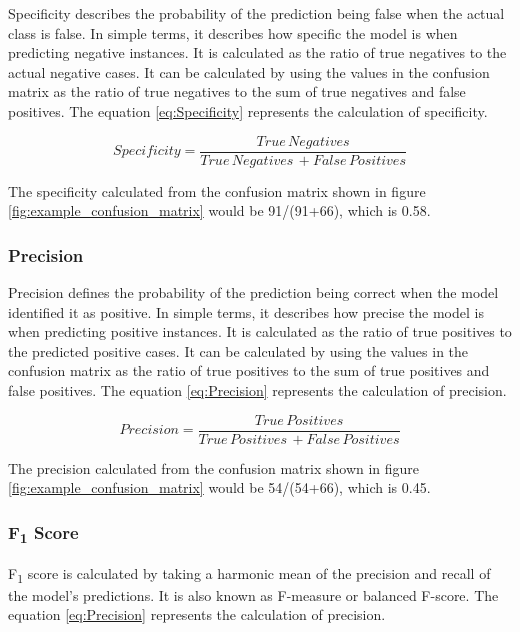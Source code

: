 \documentclass[11pt,openright]{report}
\begin{document}
Specificity describes the probability of the prediction being false when the actual class is false. In simple terms, it describes how specific the model is when predicting negative instances. It is calculated as the ratio of true negatives to the actual negative cases. It can be calculated by using the values in the confusion matrix as the ratio of true negatives to the sum of true negatives and false positives. The equation \ref{eq:Specificity}  represents the calculation of specificity.

\begin{equation}
Specificity = \dfrac{True\, Negatives }{True\, Negatives\, + False\, Positives} \label{eq:Specificity} 
 \end{equation}

The specificity calculated from the confusion matrix shown in figure \ref{fig:example_confusion_matrix} would be 91/(91+66), which is 0.58.

\subsubsection{Precision}
Precision defines the probability of the prediction being correct when the model identified it as positive. In simple terms, it describes how precise the model is when predicting positive instances. It is calculated as the ratio of true positives to the predicted positive cases. It can be calculated by using the values in the confusion matrix as the ratio of true positives to the sum of true positives and false positives. The equation \ref{eq:Precision}  represents the calculation of precision.

\begin{equation}
Precision = \dfrac{True\, Positives }{True\, Positives\, + False\, Positives} \label{eq:Precision} 
 \end{equation}

The precision calculated from the confusion matrix shown in figure \ref{fig:example_confusion_matrix} would be 54/(54+66), which is 0.45.

\subsubsection{F\textsubscript1 Score}

F\textsubscript{1} score is calculated by taking a harmonic mean of the precision and recall of the model's predictions. It is also known as F-measure or balanced F-score. The equation \ref{eq:Precision}  represents the calculation of precision.
\end{document}
